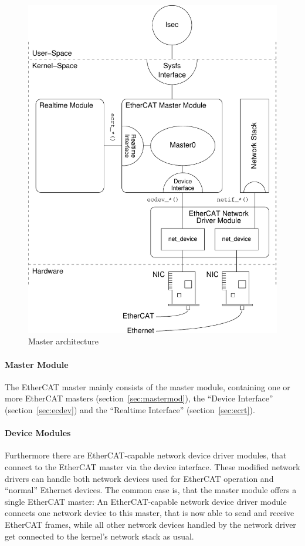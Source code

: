 \documentclass[a4paper,12pt,BCOR6mm,bibtotoc,idxtotoc]{scrbook}
\begin{document}
\begin{figure}[htbp]
  \centering
  \includegraphics[width=.9\textwidth]{images/masterarch}
  \caption{Master architecture}
  \label{fig:masterarch}
\end{figure}

\paragraph{Master Module}

The EtherCAT master mainly consists of the master module, containing
one or more EtherCAT masters (section~\ref{sec:mastermod}), the
``Device Interface'' (section~\ref{sec:ecdev}) and the ``Realtime
Interface'' (section~\ref{sec:ecrt}).

\paragraph{Device Modules}

Furthermore there are EtherCAT-capable network device driver
modules, that connect to the EtherCAT master via
the device interface. These modified network drivers can handle both
network devices used for EtherCAT operation and ``normal'' Ethernet
devices. The common case is, that the master module offers a single
EtherCAT master: An EtherCAT-capable network device driver module
connects one network device to this master, that is now able to send
and receive EtherCAT frames, while all other network devices handled
by the network driver get connected to the kernel's network stack as
usual.
\end{document}
